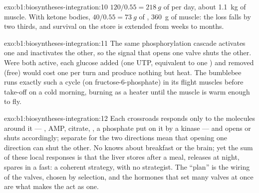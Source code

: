 \begin{solution}{exo:b1:biosyntheses-integration:10}
$120/0.55 = \qty{218}{g}$ of  per day, about \qty{1.1}{kg} of
muscle. With ketone bodies, $40/0.55 = \qty{73}{g}$ of ,
\qty{360}{g} of muscle: the loss falls by two thirds, and survival on
the  store is extended from weeks to months.
\end{solution}

\begin{solution}{exo:b1:biosyntheses-integration:11}
The same phosphorylation cascade activates one and inactivates the
other, so the signal that opens one valve shuts the other. Were both
active, each glucose added (one UTP, equivalent to one ) and removed
(free) would cost one  per turn and produce nothing but heat. The
bumblebee runs exactly such a cycle (on fructose-6-phosphate) in its
flight muscles before take-off on a cold morning, burning  as a
heater until the muscle is warm enough to fly.
\end{solution}

\begin{solution}{exo:b1:biosyntheses-integration:12}
Each crossroads  responds only to the molecules around it ---
, AMP, citrate, , a phosphate put on it by a kinase ---
and opens or shuts accordingly; separate  for the two
directions mean that opening one direction can shut the other. No
 knows about breakfast or the brain; yet the sum of these local
responses is that the liver stores after a meal, releases at night,
spares  in a fast: a coherent strategy, with no strategist. The
``plan'' is the wiring of the valves, chosen by selection, and the
hormones that set many valves at once are what makes the  act
as one.
\end{solution}

